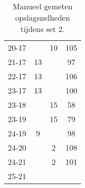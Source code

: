 \begin{table}[h!]
\begin{tabular}{|c|c|c|c|}
    20-17 &  & 10 & 105 \\
    21-17 & 13 &  & 97 \\
    22-17 & 13 &  & 106 \\
    23-17 & 13 &  & 100 \\
    23-18 &  & 15 & 58 \\
    23-19 &  & 15 & 79 \\
    24-19 & 9 &  & 98 \\
    24-20 &  & 2 & 108 \\
    24-21 &  & 2 & 101 \\
    25-21 &  &  &  \\ \hline
  \end{tabular}
  \caption[Manueel gemeten opslagsnelheden tijdens set 2]{\label{tab:PL1ServeMan2}Manueel gemeten opslagsnelheden tijdens set 2.}
\end{table}

